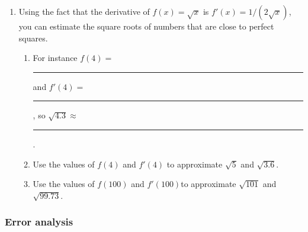 \begin{enumerate}
\item Using the fact that the derivative of $f(x) = \sqrt{x}$ is $f'(x)
= 1/(2\sqrt{x})$, you can estimate the square roots of numbers that
are close to perfect squares.

  \begin{enumerate}
  \item For instance $f(4) =$ \rule[-3pt]{.5in}{.3pt} and $f'(4) =$
\rule[-3pt]{.5in}{.3pt}, so $\sqrt{4.3} \approx$
\rule[-3pt]{.5in}{.3pt}.

  \item Use the values of $f(4)$ and $f'(4)$ to approximate $\sqrt{5}$
and $\sqrt{3.6}$.

  \item Use the values of $f(100)$ and $f'(100)$to approximate
$\sqrt{101}$ and $\sqrt{99.73}$.


\end{enumerate}
\end{enumerate}
\subsubsection{Error analysis}
\label{subsubsec:error-analysis}




